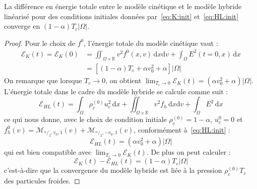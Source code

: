 \begin{pro}
  La différence en énergie totale entre le modèle cinétique et le modèle hybride linéarisé pour des conditions initiales données par~\eqref{eq:K:init} et~\eqref{eq:HL:init} converge en $(1-\alpha)T_c|\Omega|$.
\label{p:limit:convergence}
\end{pro}
\begin{proof}
  Pour le choix de $f^0$, l'énergie totale du modèle cinétique vaut :
  $$
    \begin{aligned}
      \mathcal{E}_K(t) = \mathcal{E}_K(0) &= \iint_{\Omega\times\mathbb{R}}v^2f^0(x,v)\,\mathrm{d}x\mathrm{d}v + \int_{\Omega}E^2(t=0,x)\,\mathrm{d}x \\
                                          &= \left[ (1-\alpha)T_c + \alpha v_0^2 + \alpha \right]|\Omega|
    \end{aligned}
  $$
    On remarque que lorsque $T_c\to 0$, on obtient $\lim_{T_c\to 0}\mathcal{E}_K(t) = (\alpha v_0^2 + \alpha)|\Omega|$. L'énergie totale dans le cadre du modèle hybride se calcule comme suit :
    $$
      \mathcal{E}_{HL}(t) = \int_\Omega \rho_c^{(0)}u_c^2\,\mathrm{d}x + \iint_{\Omega\times\mathbb{R}} v^2f_h\,\mathrm{d}x\mathrm{d}v + \int_\Omega E^2\,\mathrm{d}x
    $$
    ce qui nous donne, avec le choix de condition initiale $\rho_c^{(0)} = 1-\alpha$, $u_c^0 = 0$ et $f_h^0(v) = \mathcal{M}_{^\alpha/_2,v_0,1}(v) + \mathcal{M}_{^\alpha/_2,-v_0,1}(v)$, conformément à~\eqref{eq:HL:init} :
    $$
      \mathcal{E}_{HL}(t) = (\alpha v_0^2 + \alpha)|\Omega|
    $$
    qui est bien compatible avec $\lim_{T_c\to 0}\mathcal{E}_K(t)$. De plus on peut calculer :
    $$
      \mathcal{E}_K(t) - \mathcal{E}_{HL}(t) = (1-\alpha)T_c|\Omega|
    $$
    c'est-à-dire que la convergence du modèle hybride est liée à la pression $\rho_c^{(0)}T_c$ des particules froides.
\end{proof}

